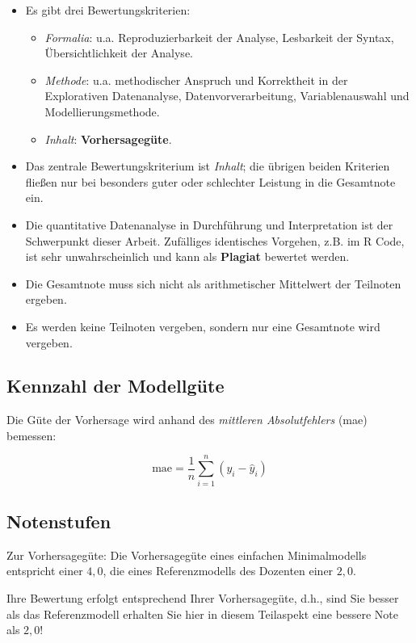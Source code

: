 \documentclass[
]{book}
\begin{document}
\begin{itemize}
\item
  Es gibt drei Bewertungskriterien:

  \begin{itemize}
  \item
    \emph{Formalia}: u.a. Reproduzierbarkeit der Analyse, Lesbarkeit der Syntax, Übersichtlichkeit der Analyse.
  \item
    \emph{Methode}: u.a. methodischer Anspruch und Korrektheit in der Explorativen Datenanalyse, Datenvorverarbeitung, Variablenauswahl und Modellierungsmethode.
  \item
    \emph{Inhalt}: \textbf{Vorhersagegüte}.
  \end{itemize}
\item
  Das zentrale Bewertungskriterium ist \emph{Inhalt}; die übrigen beiden Kriterien fließen nur bei besonders guter oder schlechter Leistung in die Gesamtnote ein.
\item
  Die quantitative Datenanalyse in Durchführung und Interpretation ist der Schwerpunkt dieser Arbeit. Zufälliges identisches Vorgehen, z.B. im R Code, ist sehr unwahrscheinlich und kann als \textbf{Plagiat} bewertet werden.
\item
  Die Gesamtnote muss sich nicht als arithmetischer Mittelwert der Teilnoten ergeben.
\item
  Es werden keine Teilnoten vergeben, sondern nur eine Gesamtnote wird vergeben.
\end{itemize}

\hypertarget{kennzahl-der-modellguxfcte}{%
\subsection{Kennzahl der Modellgüte}\label{kennzahl-der-modellguxfcte}}

Die Güte der Vorhersage wird anhand des \emph{mittleren Absolutfehlers} (mae) bemessen:

\[\text{mae} = \frac{1}{n} \sum_{i=1}^n(y_i - \hat{y}_i)\]

\hypertarget{notenstufen}{%
\subsection{Notenstufen}\label{notenstufen}}

Zur Vorhersagegüte: Die Vorhersagegüte eines einfachen Minimalmodells entspricht einer \(4,0\), die eines Referenzmodells des Dozenten einer \(2,0\).

Ihre Bewertung erfolgt entsprechend Ihrer Vorhersagegüte, d.h., sind Sie besser als das Referenzmodell erhalten Sie hier in diesem Teilaspekt eine bessere Note als \(2,0\)!
\end{document}
